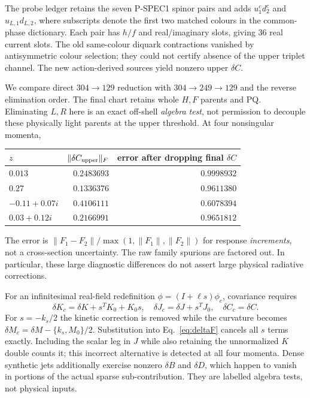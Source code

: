 \documentclass[11pt]{article}
\begin{document}
The probe ledger retains the seven P-SPEC1 spinor pairs and adds
$u^c_{1}d^c_{2}$ and $u_{L,1}d_{L,2}$, where subscripts denote the first
two matched colours in the common-phase dictionary. Each pair has
$h/f$ and real/imaginary slots, giving 36 real current slots. The old
same-colour diquark contractions vanished by antisymmetric colour
selection; they could not certify absence of the upper triplet channel.
The new action-derived sources yield nonzero upper $\delta C$.

We compare direct $304\to129$ reduction with
$304\to249\to129$ and the reverse elimination order. The final chart
retains whole $H,F$ parents and PQ. Eliminating $L,R$ here is an exact
off-shell \emph{algebra test}, not permission to decouple these physically
light parents at the upper threshold. At four nonsingular momenta,
\begin{center}
\begin{tabular}{lrr}
\toprule
$z$ & $\|\delta C_{\rm upper}\|_F$ & error after dropping final $\delta C$\\
\midrule
$0.013$ & $0.2483693$ & $0.9998932$\\
$0.27$ & $0.1336376$ & $0.9611380$\\
$-0.11+0.07i$ & $0.4106111$ & $0.6078394$\\
$0.03+0.12i$ & $0.2166991$ & $0.9651812$\\
\bottomrule
\end{tabular}
\end{center}
The error is $\|F_1-F_2\|/\max(1,\|F_1\|,\|F_2\|)$ for response
\emph{increments}, not a cross-section uncertainty. The raw family
spurions are factored out. In particular, these large diagnostic
differences do not assert large physical radiative corrections.

For an infinitesimal real-field redefinition
$\phi=(I+\ell s)\phi_c$, covariance requires
\begin{equation}
 \delta K_c=\delta K+s^TK_0+K_0s,\quad
 \delta J_c=\delta J+s^TJ_0,\quad \delta C_c=\delta C.
\end{equation}
For $s=-k_s/2$ the kinetic correction is removed while the curvature
becomes $\delta M_c=\delta M-\{k_s,M_0\}/2$.
Substitution into Eq.~\eqref{eq:deltaF} cancels all $s$ terms exactly.
Including the scalar leg in $J$ while also retaining the unnormalized
$K$ double counts it; this incorrect alternative is detected at all four
momenta. Dense synthetic jets additionally exercise nonzero $\delta B$
and $\delta D$, which happen to vanish in portions of the actual sparse
sub-contribution. They are labelled algebra tests, not physical inputs.
\end{document}
